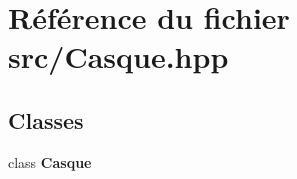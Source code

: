 \section{Référence du fichier src/\-Casque.hpp}
\label{_casque_8hpp}
\subsection*{Classes}
\begin{DoxyCompactItemize}
\item 
class {\bf Casque}
\end{DoxyCompactItemize}
